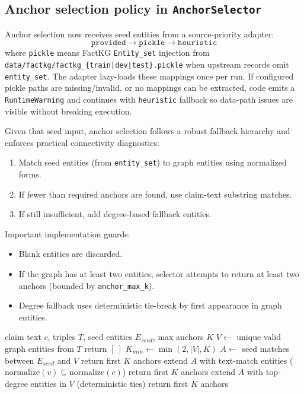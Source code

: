 \subsection{Anchor selection policy in \texttt{AnchorSelector}}
\label{subsec:anchor-policy}
Anchor selection now receives seed entities from a source-priority adapter:
\[
\texttt{provided} \rightarrow \texttt{pickle} \rightarrow \texttt{heuristic}
\]
where \texttt{pickle} means FactKG \texttt{Entity\_set} injection from
\texttt{data/factkg/factkg\_\{train|dev|test\}.pickle} when upstream records omit \texttt{entity\_set}.
The adapter lazy-loads these mappings once per run. If configured pickle paths are missing/invalid,
or no mappings can be extracted, code emits a \texttt{RuntimeWarning} and continues with
\texttt{heuristic} fallback so data-path issues are visible without breaking execution.

Given that seed input, anchor selection follows a robust fallback hierarchy and enforces practical connectivity diagnostics:
\begin{enumerate}
\item Match seed entities (from \texttt{entity\_set}) to graph entities using normalized forms.
\item If fewer than required anchors are found, use claim-text substring matches.
\item If still insufficient, add degree-based fallback entities.
\end{enumerate}

Important implementation guards:
\begin{itemize}
\item Blank entities are discarded.
\item If the graph has at least two entities, selector attempts to return at least two anchors (bounded by \texttt{anchor\_max\_k}).
\item Degree fallback uses deterministic tie-break by first appearance in graph entities.
\end{itemize}

\begin{algorithm}[H]
\caption{Anchor Selection (code-aligned)}
\begin{algorithmic}[1]
\Require claim text $c$, triples $T$, seed entities $E_{seed}$, max anchors $K$
\State $V \leftarrow$ unique valid graph entities from $T$
 \State return $[\ ]$ \EndIf
\State $K_{min} \leftarrow \min(2, |V|, K)$
\State $A \leftarrow$ seed matches between $E_{seed}$ and $V$
 \State return first $K$ anchors \EndIf
\State extend $A$ with text-match entities ($\text{normalize}(v) \subseteq \text{normalize}(c)$)
 \State return first $K$ anchors \EndIf
\State extend $A$ with top-degree entities in $V$ (deterministic ties)
\State return first $K$ anchors
\end{algorithmic}
\label{alg:anchor-selection}
\end{algorithm}

